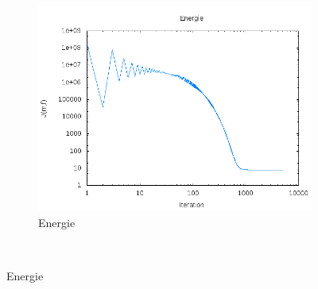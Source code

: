 \documentclass[a4paper,12pt]{article}
\begin{document}
\begin{figure}[!h]
\begin{subfigure}[b]{0.35\linewidth}
	\includegraphics[width=\textwidth]{img/2DMixture/energie.png}
	\caption{Energie}
	\end{subfigure}
	~
	

\end{figure}
\end{document}
